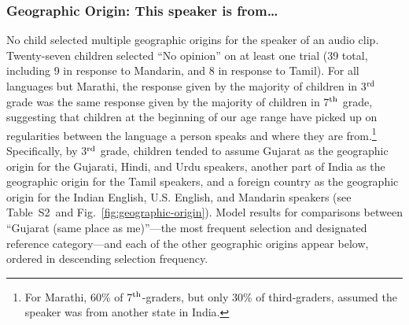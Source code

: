 \documentclass{foushee-adapted-preprint}
\newcommand{\geomeanstab}{S2}
\begin{document}
\subsubsection{Geographic Origin: This speaker is from\ldots} 
No child selected multiple geographic origins for the speaker of an audio clip. Twenty-seven children selected ``No opinion'' on at least one trial (39 total, including 9 in response to Mandarin, and 8 in response to Tamil). 
For all languages but Marathi, the response given by the majority of children in 3$^{\textnormal{rd}}$ grade was the same response given by the majority of children in 7$^{\textnormal{th}}$ grade, suggesting that children at the beginning of our age range have picked up on regularities between the language a person speaks and where they are from.\footnote{For Marathi, 60\% of 7$^{\textnormal{th}}$-graders, but only 30\% of third-graders, assumed the speaker was from another state in India.}
Specifically, by 3$^{\textnormal{rd}}$ grade, children tended to assume Gujarat as the geographic origin for the Gujarati, Hindi, and Urdu speakers, another part of India as the geographic origin for the Tamil speakers, and a foreign country as the geographic origin for the Indian English, U.S. English, and Mandarin speakers (see Table~\geomeanstab\ and Fig.~\ref{fig:geographic-origin}). 
Model results for comparisons between ``Gujarat (same place as me)''---the most frequent selection and designated reference category---and each of the other geographic origins appear below, ordered in descending selection frequency.
\end{document}
